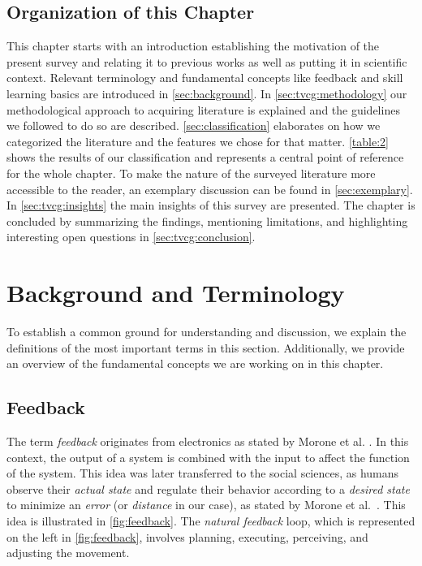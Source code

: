 \subsection{Organization of this Chapter}
This chapter starts with an introduction establishing the motivation of the present survey and relating it to previous works as well as putting it in scientific context. Relevant terminology and fundamental concepts like feedback and skill learning basics are introduced in \autoref{sec:background}. In \autoref{sec:tvcg:methodology} our methodological approach to acquiring literature is explained and the guidelines we followed to do so are described. \autoref{sec:classification} elaborates on how we categorized the literature and the features we chose for that matter. \autoref{table:2} shows the results of our classification and represents a central point of reference for the whole chapter. To make the nature of the surveyed literature more accessible to the reader, an exemplary discussion can be found in \autoref{sec:exemplary}. In \autoref{sec:tvcg:insights} the main insights of this survey are presented. The chapter is concluded by summarizing the findings, mentioning limitations, and highlighting interesting open questions in \autoref{sec:tvcg:conclusion}.


\section{Background and Terminology \label{sec:background}}
To establish a common ground for understanding and discussion, we explain the definitions of the most important terms in this section. Additionally, we provide an overview of the fundamental concepts we are working on in this chapter.

\subsection{Feedback \label{sec:feedback}}
The term \emph{feedback} originates from electronics as stated by Morone et al. \cite{morone2021dab}. In this context, the output of a system is combined with the input to affect the function of the system. This idea was later transferred to the social sciences, as humans observe their \emph{actual state} and regulate their behavior according to a \emph{desired state} to minimize an \emph{error} (or \emph{distance} in our case), as stated by Morone et al.~\cite{morone2021dab}. This idea is illustrated in \autoref{fig:feedback}. The \emph{natural feedback} loop, which is represented on the left in \autoref{fig:feedback}, involves planning, executing, perceiving, and adjusting the movement.


